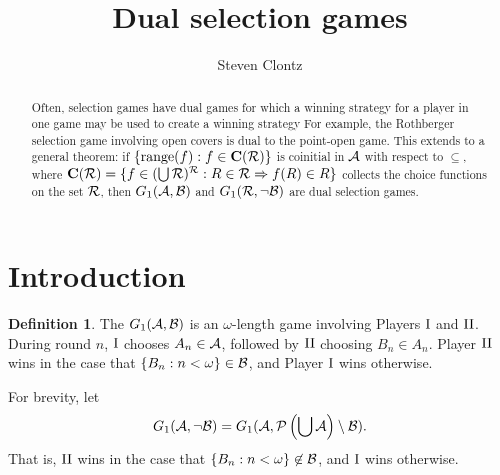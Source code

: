 \documentclass{amsart}
\theoremstyle{plain}
\theoremstyle{definition}
\newtheorem{definition}[theorem]{Definition}
\theoremstyle{remark}
\theoremstyle{plain}
\theoremstyle{definition}
\theoremstyle{remark}
\begin{document}
\title{Dual selection games}



\author{Steven Clontz}
\address{Department of Mathematics and Statistics,
The University of South Alabama,
Mobile, AL 36688}









\begin{abstract}
  Often, selection games have dual games for which a winning
  strategy for a player in one game may be used to create
  a winning strategy 
  For example, the Rothberger selection game involving open covers
  is dual to the point-open game. This extends to a general
  theorem: if \(\{\text{range}(f):f\in\mathbf C(\mathcal{R})\}\) is coinitial in \(\mathcal{A}\)
  with respect to \(\subseteq\),
  where \(\mathbf C(\mathcal{R})=\{f\in(\bigcup\mathcal{R})^{\mathcal{R}}:R\in\mathcal{R}\Rightarrow f(R)\in R\}\) 
  collects the choice functions on the set \(\mathcal{R}\),
  then \(G_1(\mathcal{A},\mathcal{B})\) and \(G_1(\mathcal{R},\neg\mathcal{B})\)
  are dual selection games. 
\end{abstract}


\maketitle







\section{Introduction}

\begin{definition}
  The  \(G_{1}(\mathcal{A},\mathcal{B})\) 
  is an \(\omega\)-length game involving Players \(\mathrm{I}\) and \(\mathrm{II}\). 
  During round \(n\), \(\mathrm{I}\) chooses
  \(A_n\in\mathcal{A}\), followed by \(\mathrm{II}\) choosing \(B_n\in A_n\).
  Player \(\mathrm{II}\) wins in the case that \(\{B_n:n<\omega\}\in\mathcal{B}\),
  and Player \(\mathrm{I}\) wins otherwise.
\end{definition}

  For brevity, let 
  \[
    G_{1}(\mathcal{A},\neg \mathcal{B})
      =
    G_{1}(\mathcal{A},\mathcal{P}\left(\bigcup \mathcal{A}\right)\setminus \mathcal{B})
  .\]
  That is, \(\mathrm{II}\) wins in the case that \(\{B_n:n<\omega\}\not\in\mathcal{B}\),
  and \(\mathrm{I}\) wins otherwise.
\end{document}
